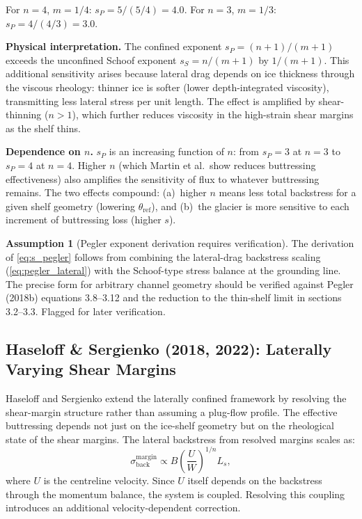 \documentclass[11pt]{article}
\theoremstyle{definition}
\newtheorem{assumption}{Assumption}
\begin{document}
For $n = 4$, $m = 1/4$: $s_P = 5/(5/4) = 4.0$.  For $n = 3$, $m = 1/3$: $s_P = 4/(4/3) = 3.0$.

\textbf{Physical interpretation.}  The confined exponent $s_P = (n+1)/(m+1)$ exceeds the unconfined Schoof exponent $s_S = n/(m+1)$ by $1/(m+1)$.  This additional sensitivity arises because lateral drag depends on ice thickness through the viscous rheology: thinner ice is softer (lower depth-integrated viscosity), transmitting less lateral stress per unit length.  The effect is amplified by shear-thinning ($n > 1$), which further reduces viscosity in the high-strain shear margins as the shelf thins.

\textbf{Dependence on $n$.}  $s_P$ is an increasing function of $n$: from $s_P = 3$ at $n = 3$ to $s_P = 4$ at $n = 4$.  Higher $n$ (which Martin et al.\ show reduces buttressing effectiveness) also amplifies the sensitivity of flux to whatever buttressing remains.  The two effects compound: (a)~higher $n$ means less total backstress for a given shelf geometry (lowering $\theta_{\text{ref}}$), and (b)~the glacier is more sensitive to each increment of buttressing loss (higher $s$).

\begin{assumption}[Pegler exponent derivation requires verification]
  \label{assump:pegler_verify}
  The derivation of \cref{eq:s_pegler} follows from combining the lateral-drag backstress scaling (\cref{eq:pegler_lateral}) with the Schoof-type stress balance at the grounding line.  The precise form for arbitrary channel geometry should be verified against Pegler (2018b) equations 3.8--3.12 and the reduction to the thin-shelf limit in sections 3.2--3.3.  Flagged for later verification.
\end{assumption}

\subsection{Haseloff \& Sergienko (2018, 2022): Laterally Varying Shear Margins}
\label{sec:haseloff}

Haseloff and Sergienko extend the laterally confined framework by resolving the shear-margin structure rather than assuming a plug-flow profile.  The effective buttressing depends not just on the ice-shelf geometry but on the rheological state of the shear margins.  The lateral backstress from resolved margins scales as:
\begin{equation}
  \sigma_{\text{back}}^{\text{margin}} \propto B \left(\frac{U}{W}\right)^{1/n} L_s,
  \label{eq:haseloff_backstress}
\end{equation}
where $U$ is the centreline velocity.  Since $U$ itself depends on the backstress through the momentum balance, the system is coupled.  Resolving this coupling introduces an additional velocity-dependent correction.
\end{document}
